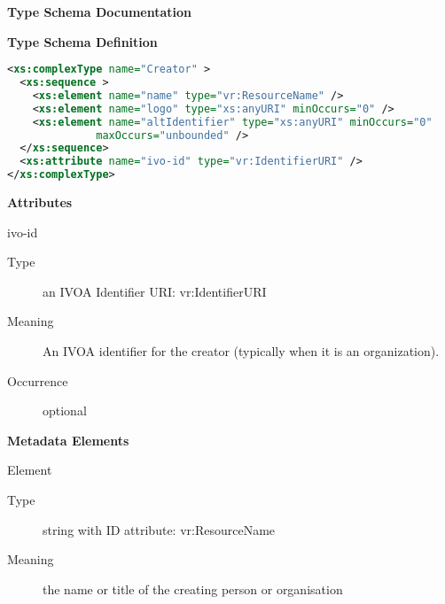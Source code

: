 \documentclass[11pt,a4paper]{ivoa}
\begin{document}
\begin{generated}
\begingroup
      	\renewcommand*\descriptionlabel[1]{%
      	\hbox to 5.5em{\emph{#1}\hfil}}\vspace{2ex}\noindent\textbf{ Type Schema Documentation}


\vspace{1ex}\noindent\textbf{ Type Schema Definition}

\begin{lstlisting}[language=XML,basicstyle=\footnotesize]
<xs:complexType name="Creator" >
  <xs:sequence >
    <xs:element name="name" type="vr:ResourceName" />
    <xs:element name="logo" type="xs:anyURI" minOccurs="0" />
    <xs:element name="altIdentifier" type="xs:anyURI" minOccurs="0"
              maxOccurs="unbounded" />
  </xs:sequence>
  <xs:attribute name="ivo-id" type="vr:IdentifierURI" />
</xs:complexType>
\end{lstlisting}

\vspace{0.5ex}\noindent\textbf{ Attributes}

\begingroup\small\begin{bigdescription}
\item[ivo-id]
\begin{description}
\item[Type] an IVOA Identifier URI: vr:IdentifierURI
\item[Meaning] 
             An IVOA identifier for the creator (typically when it is
             an organization).
           
\item[Occurrence] optional

\end{description}


\end{bigdescription}\endgroup



\vspace{0.5ex}\noindent\textbf{ Metadata Elements}

\begingroup\small\begin{bigdescription}\item[Element \xmlel{name}]
\begin{description}
\item[Type] string with ID attribute: vr:ResourceName
\item[Meaning] 
                  the name or title of the creating person or organisation
              

\end{description}
\end{bigdescription}
\end{generated}
\end{document}
